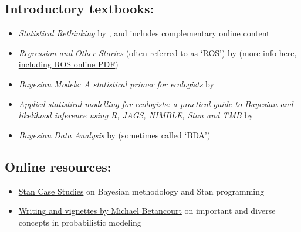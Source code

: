\documentclass{article}
\begin{document}
\subsection*{\textbf{Introductory textbooks:}}

\begin{itemize}
\item \emph{Statistical Rethinking} by \cite{McElreathSR}, and includes \href{http://xcelab.net/rm/statistical-rethinking/}{complementary online content}
\item \emph{Regression and Other Stories} (often referred to as `ROS') by \cite{GelmanROS} (\href{https://avehtari.github.io/ROS-Examples/}{more info here, including ROS online PDF}) 
\item \emph{Bayesian Models: A statistical primer for ecologists} by \cite{hobbs2015}
\item \emph{Applied statistical modelling for ecologists: a practical guide to Bayesian and likelihood inference using R, JAGS, NIMBLE, Stan and TMB} by \cite{Kery2024}
\item \emph{Bayesian Data Analysis} by \cite{GelmanBDA} (sometimes called `BDA')
 \end{itemize}

\subsection*{\textbf{Online resources:}}

\begin{itemize}
\item \href{https://mc-stan.org/learn-stan/case-studies.html}{Stan Case Studies} on Bayesian methodology and Stan programming \citep{stanCaseStudies}
\item \href{https://betanalpha.github.io/writing/}{Writing and vignettes by Michael Betancourt} on important and diverse concepts in probabilistic modeling \citep{betancourt_writing}
\end{itemize}
\end{document}
